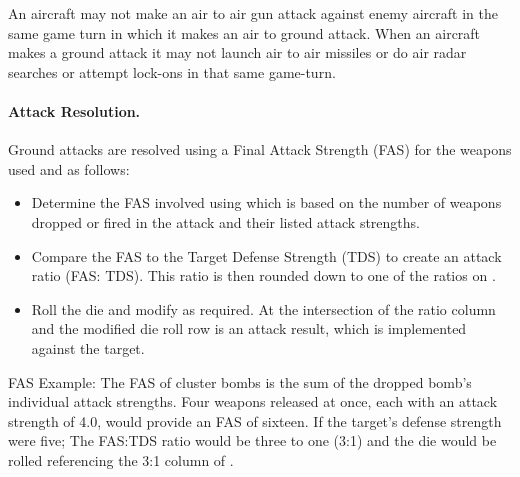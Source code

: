 An aircraft may not make an air to air gun attack against enemy aircraft in the same game turn in which it makes an air to ground attack. When an aircraft makes a ground attack it may not launch air to air missiles or do air radar searches or attempt lock-ons in that same game-turn.

\paragraph{Attack Resolution.} 



Ground attacks are resolved using a Final Attack Strength (FAS) for the weapons used and  as follows:
\begin{itemize}
\item Determine the FAS involved using  which is based on the number of weapons dropped or fired in the attack and their listed attack strengths.
\item Compare the FAS to the Target Defense Strength (TDS) to create an attack ratio (FAS: TDS). This ratio is then rounded down to one of the ratios on .
\item Roll the die and modify as required. At the intersection of the ratio column and the modified die roll row is an attack result, which is implemented against the target.
\end{itemize}

FAS Example: The FAS of cluster bombs is the sum of the dropped bomb's individual attack strengths. Four weapons released at once, each with an attack strength of 4.0, would provide an FAS of sixteen. If the target's defense strength were five; The FAS:TDS ratio would be three to one (3:1) and the die would be rolled referencing the 3:1 column of .

